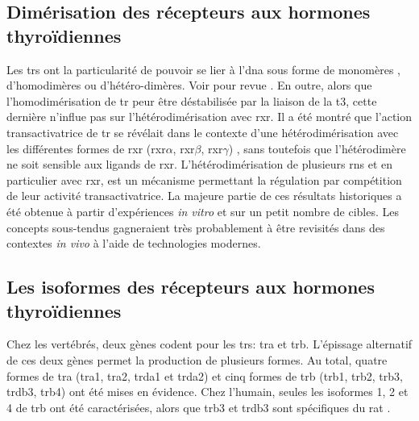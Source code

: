 \documentclass[../main.tex]{subfiles}
\begin{document}
\subsection{Dimérisation des récepteurs aux hormones thyroïdiennes}
Les \glspl{tr} ont la particularité de pouvoir se lier à l'\gls{dna} sous forme de monomères \citep{Schrader1994}, d'homodimères ou d'hétéro-dimères. Voir pour revue \citet{Ikeda1994}.
En outre, alors que l'homodimérisation de \gls{tr} peur être déstabilisée par la liaison de la \gls{t3}, cette dernière n'influe pas sur l'hétérodimérisation avec \gls{rxr}.
Il a été montré que l'action transactivatrice de \gls{tr} se révélait dans le contexte d'une hétérodimérisation avec les différentes formes de \gls{rxr} (\gls{rxr}$\alpha$, \gls{rxr}$\beta$, \gls{rxr}$\gamma$) \citep{Umesono1988a,Mangelsdorf1990,Kliewer1992,Zhang1992}, sans toutefois que l'hétérodimère ne soit sensible aux ligands de \gls{rxr}.
L'hétérodimérisation de plusieurs \glspl{rn} et en particulier avec \gls{rxr}, est un mécanisme permettant la régulation par compétition de leur activité transactivatrice.
La majeure partie de ces résultats historiques a été obtenue à partir d'expériences \textit{in vitro} et sur un petit nombre de cibles.
Les concepts sous-tendus gagneraient très probablement à être revisités dans des contextes \textit{in vivo} à l'aide de technologies modernes.


\subsection{Les isoformes des récepteurs aux hormones thyroïdiennes}
Chez les vertébrés, deux gènes codent pour les \glspl{tr}: \gls{tra} et \gls{trb}.
L'épissage alternatif de ces deux gènes permet la production de plusieurs formes.
Au total, quatre formes de \gls{tra} (\gls{tra}1, \gls{tra}2, \gls{trda}1 et \gls{trda}2) et cinq formes de \gls{trb} (\gls{trb}1, \gls{trb}2, \gls{trb}3, \gls{trdb}3, \gls{trb}4) ont été mises en évidence.
Chez l'humain, seules les isoformes 1, 2 et 4 de \gls{trb} ont été caractérisées, alors que \gls{trb}3 et \gls{trdb}3 sont spécifiques du rat \citep{Williams2000}.

\end{document}
